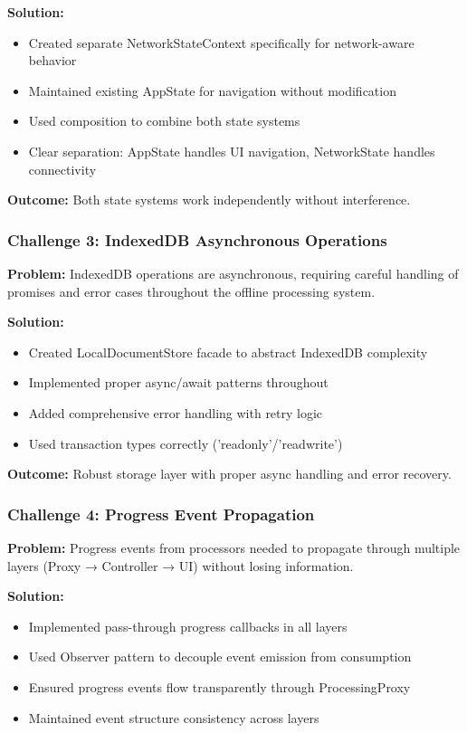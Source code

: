 \documentclass[11pt, a4paper]{article}
\theoremstyle{plain}
\theoremstyle{definition}
\begin{document}
\textbf{Solution:}
\begin{itemize}
    \item Created separate NetworkStateContext specifically for network-aware behavior
    \item Maintained existing AppState for navigation without modification
    \item Used composition to combine both state systems
    \item Clear separation: AppState handles UI navigation, NetworkState handles connectivity
\end{itemize}

\textbf{Outcome:} Both state systems work independently without interference.

\subsubsection{Challenge 3: IndexedDB Asynchronous Operations}

\textbf{Problem:} IndexedDB operations are asynchronous, requiring careful handling of promises and error cases throughout the offline processing system.

\textbf{Solution:}
\begin{itemize}
    \item Created LocalDocumentStore facade to abstract IndexedDB complexity
    \item Implemented proper async/await patterns throughout
    \item Added comprehensive error handling with retry logic
    \item Used transaction types correctly ('readonly'/'readwrite')
\end{itemize}

\textbf{Outcome:} Robust storage layer with proper async handling and error recovery.

\subsubsection{Challenge 4: Progress Event Propagation}

\textbf{Problem:} Progress events from processors needed to propagate through multiple layers (Proxy → Controller → UI) without losing information.

\textbf{Solution:}
\begin{itemize}
    \item Implemented pass-through progress callbacks in all layers
    \item Used Observer pattern to decouple event emission from consumption
    \item Ensured progress events flow transparently through ProcessingProxy
    \item Maintained event structure consistency across layers
\end{itemize}
\end{document}
